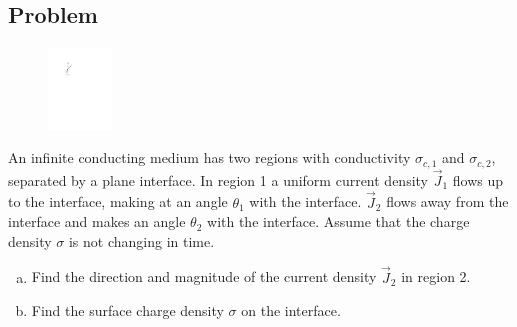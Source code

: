 \documentclass[solutions]{esg8022pset}
\begin{document}
\subsection{Problem}
  \begin{figure}\vspace{-5\intextsep}
    \begin{center}\includegraphics[width=0.15\textwidth]{ps06_07_01}\end{center}
  \end{figure}
  An infinite conducting medium has two regions with conductivity $\sigma_{c,1}$ and $\sigma_{c,2}$, separated by a plane interface. In
  region 1 a uniform current density $\vec J_1$ flows up to the interface, making at an angle $\theta_1$ with the interface. $\vec J_2$ flows away from the interface and makes an angle $\theta_2$ with the interface. Assume that the charge density $\sigma$ is not changing in time.
  \begin{enumerate}[(a)]
    \item Find the direction and magnitude of the current density $\vec J_2$ in region 2.
    \item Find the surface charge density $\sigma$ on the interface.
  \end{enumerate}
\end{document}
